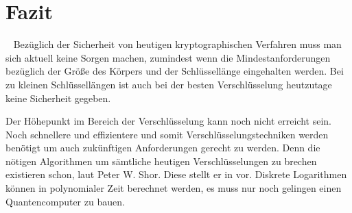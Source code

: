 \section*{Fazit}~\label{Kapitel Fazit}
	Bezüglich der Sicherheit von heutigen kryptographischen Verfahren muss man sich aktuell keine Sorgen machen, zumindest wenn die Mindestanforderungen bezüglich der Größe des Körpers und der Schlüssellänge eingehalten werden. Bei zu kleinen Schlüssellängen ist auch bei der besten Verschlüsselung heutzutage keine Sicherheit gegeben.
	
	\wupp Der Höhepunkt im Bereich der Verschlüsselung kann noch nicht erreicht sein. Noch schnellere und effizientere und somit  Verschlüsselungstechniken werden benötigt um auch zukünftigen Anforderungen gerecht zu werden. Denn die nötigen Algorithmen um sämtliche heutigen Verschlüsselungen zu brechen existieren schon, laut Peter W. Shor. Diese stellt er in \cite{Algorithms:for:Quantum:Computation:Discrete:Logarithms:and:Factoring} vor. Diskrete Logarithmen können in polynomialer Zeit berechnet werden, es muss nur noch gelingen einen Quantencomputer zu bauen.